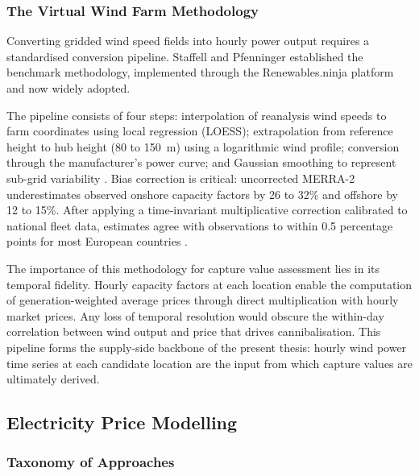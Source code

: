 \subsubsection{The Virtual Wind Farm Methodology}\label{sec:virtual_wind_farm}

Converting gridded wind speed fields into hourly power output requires a standardised conversion pipeline. Staffell and Pfenninger \cite{Staffell2016} established the benchmark methodology, implemented through the Renewables.ninja platform and now widely adopted.

\vspace{4pt}

The pipeline consists of four steps: interpolation of reanalysis wind speeds to farm coordinates using local regression (LOESS); extrapolation from reference height to hub height (80 to 150~m) using a logarithmic wind profile; conversion through the manufacturer's power curve; and Gaussian smoothing to represent sub-grid variability \cite{Staffell2016}. Bias correction is critical: uncorrected MERRA-2 underestimates observed onshore capacity factors by 26 to 32\% and offshore by 12 to 15\%. After applying a time-invariant multiplicative correction calibrated to national fleet data, estimates agree with observations to within 0.5 percentage points for most European countries \cite{Staffell2016}.

\vspace{4pt}

The importance of this methodology for capture value assessment lies in its temporal fidelity. Hourly capacity factors at each location enable the computation of generation-weighted average prices through direct multiplication with hourly market prices. Any loss of temporal resolution would obscure the within-day correlation between wind output and price that drives cannibalisation. This pipeline forms the supply-side backbone of the present thesis: hourly wind power time series at each candidate location are the input from which capture values are ultimately derived.

\subsection{Electricity Price Modelling}\label{sec:price_modelling}

\subsubsection{Taxonomy of Approaches}\label{sec:price_taxonomy}

